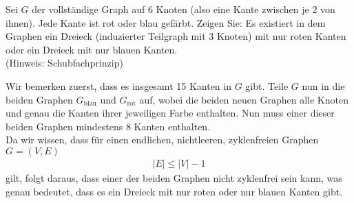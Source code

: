 
\begin{exercise}

Sei $G$ der vollständige Graph auf 6 Knoten (also eine Kante zwischen je 2 von ihnen).
Jede Kante ist rot oder blau gefärbt. Zeigen Sie: Es existiert in dem Graphen
ein Dreieck (induzierter Teilgraph mit 3 Knoten) mit nur roten Kanten oder ein Dreieck
mit nur blauen Kanten. \\
(Hinweis: Schubfachprinzip)
\end{exercise}


\begin{solution}

Wir bemerken zuerst, dass es insgesamt 15 Kanten in $G$ gibt. Teile $G$
nun in die beiden Graphen $G_{\text{blau}}$ und $G_{\text{rot}}$ auf, wobei
die beiden neuen Graphen alle Knoten und genau die Kanten ihrer jeweiligen Farbe
enthalten. Nun muss einer dieser beiden Graphen mindestens 8 Kanten enthalten. \\
Da wir wissen, dass für einen endlichen, nichtleeren, zyklenfreien Graphen $G = (V,E)$
\begin{align*}
  |E| \leq |V| - 1
\end{align*}
gilt, folgt daraus, dass einer der beiden Graphen nicht zyklenfrei sein kann,
was genau bedeutet, dass es ein Dreieck mit nur roten oder nur blauen Kanten gibt.
\end{solution}

